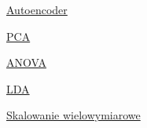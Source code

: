 \underline{Autoencoder}

\underline{PCA}

\underline{ANOVA}

\underline{LDA}

\underline{Skalowanie wielowymiarowe}